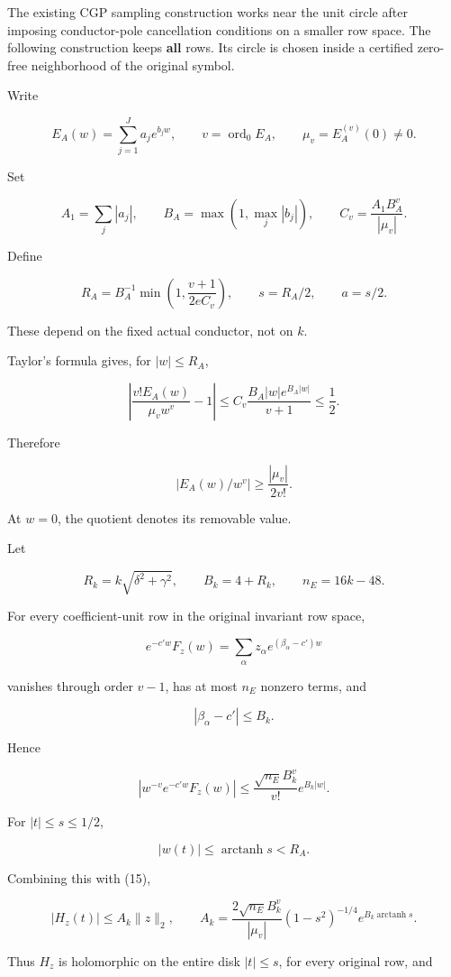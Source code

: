 \documentclass[11pt]{article}
\begin{document}
The existing CGP sampling construction works near the unit circle after imposing conductor-pole cancellation conditions on a smaller row space. The following construction keeps \textbf{all} rows. Its circle is chosen inside a certified zero-free neighborhood of the original symbol.

Write

\[
E_A(w)=\sum_{j=1}^{J}a_je^{b_jw},
\qquad
v=\operatorname{ord}_0E_A,
\qquad
\mu_v=E_A^{(v)}(0)\ne0.
\]

Set

\[
A_1=\sum_j|a_j|,
\qquad B_A=\max(1,\max_j|b_j|),
\qquad
C_v=\frac{A_1B_A^v}{|\mu_v|}.
\]

Define

\[
R_A=
B_A^{-1}
\min\left(1,\frac{v+1}{2eC_v}\right),
\qquad
s=R_A/2,\qquad a=s/2.
\tag{14}
\]

These depend on the fixed actual conductor, not on \(k\).

Taylor's formula gives, for \(|w|\le R_A\),

\[
\left|
\frac{v!E_A(w)}{\mu_vw^v}-1
\right|
\le
C_v\frac{B_A|w|e^{B_A|w|}}{v+1}
\le\frac12.
\]

Therefore

\[
\boxed{
|E_A(w)/w^v|\ge\frac{|\mu_v|}{2v!}.
}
\tag{15}
\]

At \(w=0\), the quotient denotes its removable value.

Let

\[
R_k=k\sqrt{\delta^2+\gamma^2},
\qquad B_k=4+R_k,
\qquad n_E=16k-48.
\]

For every coefficient-unit row in the original invariant row space,

\[
e^{-c'w}F_z(w)
=\sum_\alpha z_\alpha e^{(\beta_\alpha-c')w}
\]

vanishes through order \(v-1\), has at most \(n_E\) nonzero terms, and

\[
|\beta_\alpha-c'|\le B_k.
\]

Hence

\[
\left|
w^{-v}e^{-c'w}F_z(w)
\right|
\le
\frac{\sqrt{n_E}B_k^v}{v!}e^{B_k|w|}.
\]

For \(|t|\le s\le1/2\),

\[
|w(t)|\le\operatorname{arctanh}s<R_A.
\]

Combining this with (15),

\[
\boxed{
|H_z(t)|\le A_k\|z\|_2,
\qquad
A_k=
\frac{2\sqrt{n_E}B_k^v}{|\mu_v|}
(1-s^2)^{-1/4}
e^{B_k\operatorname{arctanh}s}.
}
\tag{16}
\]

Thus \(H_z\) is holomorphic on the entire disk \(|t|\le s\), for every original row, and
\end{document}
